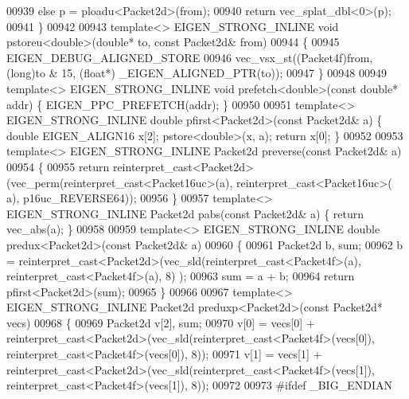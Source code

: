 \begin{DoxyCode}
{00939   \textcolor{keywordflow}{else}                                  p = ploadu<Packet2d>(from);
00940   \textcolor{keywordflow}{return} vec\_splat\_dbl<0>(p);
00941 \}
00942 
00943 \textcolor{keyword}{template}<> EIGEN\_STRONG\_INLINE \textcolor{keywordtype}{void} pstoreu<double>(\textcolor{keywordtype}{double}*  to, \textcolor{keyword}{const} Packet2d& from)
00944 \{
00945   EIGEN\_DEBUG\_ALIGNED\_STORE
00946   vec\_vsx\_st((Packet4f)from, (\textcolor{keywordtype}{long})to & 15, (\textcolor{keywordtype}{float}*) \_EIGEN\_ALIGNED\_PTR(to));
00947 \}
00948 
00949 \textcolor{keyword}{template}<> EIGEN\_STRONG\_INLINE \textcolor{keywordtype}{void} prefetch<double>(\textcolor{keyword}{const} \textcolor{keywordtype}{double}* addr) \{ EIGEN\_PPC\_PREFETCH(addr); \}
00950 
00951 \textcolor{keyword}{template}<> EIGEN\_STRONG\_INLINE \textcolor{keywordtype}{double}  pfirst<Packet2d>(\textcolor{keyword}{const} Packet2d& a) \{ \textcolor{keywordtype}{double} EIGEN\_ALIGN16 x[2]; 
      pstore<double>(x, a); \textcolor{keywordflow}{return} x[0]; \}
00952 
00953 \textcolor{keyword}{template}<> EIGEN\_STRONG\_INLINE Packet2d preverse(\textcolor{keyword}{const} Packet2d& a)
00954 \{
00955   \textcolor{keywordflow}{return} \textcolor{keyword}{reinterpret\_cast<}Packet2d\textcolor{keyword}{>}(vec\_perm(reinterpret\_cast<Packet16uc>(a), reinterpret\_cast<Packet16uc>(
      a), p16uc\_REVERSE64));
00956 \}
00957 \textcolor{keyword}{template}<> EIGEN\_STRONG\_INLINE Packet2d pabs(\textcolor{keyword}{const} Packet2d& a) \{ \textcolor{keywordflow}{return} vec\_abs(a); \}
00958 
00959 \textcolor{keyword}{template}<> EIGEN\_STRONG\_INLINE \textcolor{keywordtype}{double} predux<Packet2d>(\textcolor{keyword}{const} Packet2d& a)
00960 \{
00961   Packet2d b, sum;
00962   b   = \textcolor{keyword}{reinterpret\_cast<}Packet2d\textcolor{keyword}{>}(vec\_sld(reinterpret\_cast<Packet4f>(a), reinterpret\_cast<Packet4f>(a), 8)
      );
00963   sum = a + b;
00964   \textcolor{keywordflow}{return} pfirst<Packet2d>(sum);
00965 \}
00966 
00967 \textcolor{keyword}{template}<> EIGEN\_STRONG\_INLINE Packet2d preduxp<Packet2d>(\textcolor{keyword}{const} Packet2d* vecs)
00968 \{
00969   Packet2d v[2], sum;
00970   v[0] = vecs[0] + \textcolor{keyword}{reinterpret\_cast<}Packet2d\textcolor{keyword}{>}(vec\_sld(reinterpret\_cast<Packet4f>(vecs[0]), 
      reinterpret\_cast<Packet4f>(vecs[0]), 8));
00971   v[1] = vecs[1] + \textcolor{keyword}{reinterpret\_cast<}Packet2d\textcolor{keyword}{>}(vec\_sld(reinterpret\_cast<Packet4f>(vecs[1]), 
      reinterpret\_cast<Packet4f>(vecs[1]), 8));
00972  
00973 \textcolor{preprocessor}{#ifdef \_BIG\_ENDIAN}
}
\end{DoxyCode}
